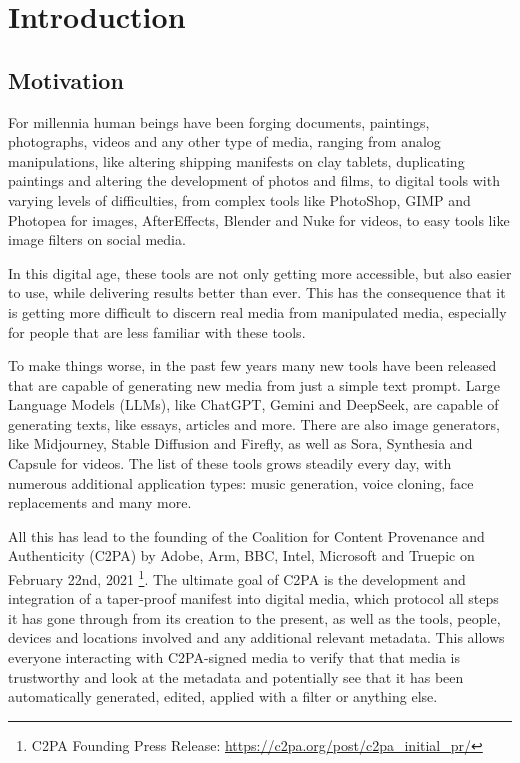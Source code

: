 \chapter{Introduction\label{cha:chapter1}}

\section{Motivation\label{sec:moti}}

For millennia human beings have been forging documents, paintings, photographs, videos and any other type of media, ranging from analog manipulations, like altering shipping manifests on clay tablets, duplicating paintings and altering the development of photos and films, to digital tools with varying levels of difficulties, from complex tools like PhotoShop, GIMP and Photopea for images, AfterEffects, Blender and Nuke for videos, to easy tools like image filters on social media.

In this digital age, these tools are not only getting more accessible, but also easier to use, while delivering results better than ever. This has the consequence that it is getting more difficult to discern real media from manipulated media, especially for people that are less familiar with these tools.

To make things worse, in the past few years many new tools have been released that are capable of generating new media from just a simple text prompt. Large Language Models (LLMs), like ChatGPT, Gemini and DeepSeek, are capable of generating texts, like essays, articles and more. There are also image generators, like Midjourney, Stable Diffusion and Firefly, as well as Sora, Synthesia and Capsule for videos. The list of these tools grows steadily every day, with numerous additional application types: music generation, voice cloning, face replacements and many more.

All this has lead to the founding of the Coalition for Content Provenance and Authenticity (C2PA) by Adobe, Arm, BBC, Intel, Microsoft and Truepic on February 22nd, 2021 \footnote{C2PA Founding Press Release: \url{https://c2pa.org/post/c2pa_initial_pr/}}. The ultimate goal of C2PA is the development and integration of a taper-proof manifest into digital media, which protocol all steps it has gone through from its creation to the present, as well as the tools, people, devices and locations involved and any additional relevant metadata. This allows everyone interacting with C2PA-signed media to verify that that media is trustworthy and look at the metadata and potentially see that it has been automatically generated, edited, applied with a filter or anything else.

